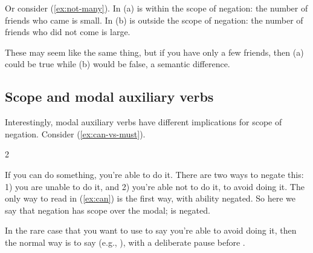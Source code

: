 Or consider (\ref{ex:not-many}). In (a)  is within the scope of negation: the number of friends who came is small. In (b)  is outside the scope of negation: the number of friends who did not come is large.

\ea \label{ex:not-many}
    \z
\z
\noindent These may seem like the same thing, but if you have only a few friends, then (a) could be true while (b) would be false, a semantic difference.


\subsection{Scope and modal auxiliary verbs}

Interestingly, modal auxiliary verbs have different implications for scope of negation. Consider (\ref{ex:can-vs-must}).

\begin{multicols}{2}
\ea \label{ex:can-vs-must}
    \ea \label{ex:can}
    \z
    \ex \label{ex:must}
        \z
    \z
\z
\end{multicols}

If you can do something, you're able to do it. There are two ways to negate this: 1) you are unable to do it, and 2) you're able not to do it, to avoid doing it. The only way to read  in (\ref{ex:can}) is the first way, with ability negated. So here we say that negation has scope over the modal;  is negated.

In the rare case that you want to use  to say you're able to avoid doing it, then the normal way is to say  (e.g., ), with a deliberate pause before .

